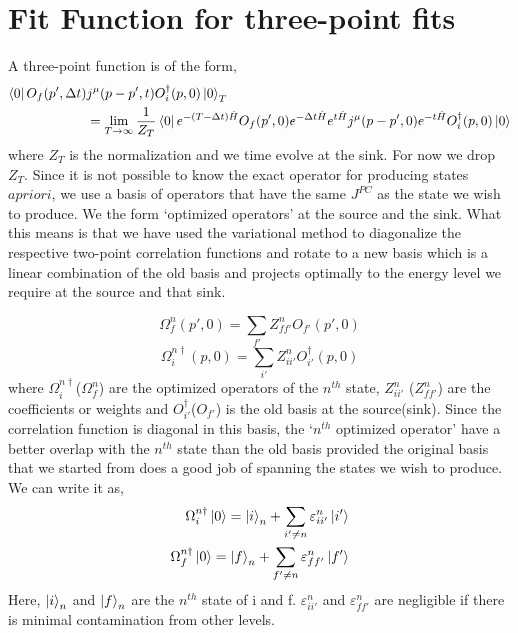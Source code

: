 \documentclass[10pt]{article}
\begin{document}
\section{Fit Function for three-point fits}
A three-point function is of the form,
\begin{align*}
\bra{0}O_{f}(p',\Delta t)&j^{\mu}(p - p',t)O^{\dagger}_{i}(p,0) \ket{0}_T \\
&= \lim_{T \to \infty} \frac{1}{Z_T} \bra{0}e^{-(T- \Delta t)\hat{H}}O_{f}(p',0)e^{- \Delta t \hat{H}} e^{ t \hat{H}} j^{\mu}(p - p',0) e^{ - t \hat{H}} O^{\dagger}_{i}(p,0) \ket{0}
\end{align*}
where $Z_T$ is the normalization and we time evolve at the sink.  For now we drop $Z_T$. Since it is not possible to know the exact operator for producing states $apriori$, we use a basis of operators that have the same $J^{PC}$ as the state we wish to produce. We the form `optimized operators' at the source and the sink. What this means is that we have used the variational method to diagonalize the respective two-point correlation functions and rotate to a new basis which is a linear combination of the old basis and projects optimally to the energy level we require at the source and that sink. \par
\begin{equation}
\Omega^{n}_{f}(p',0) = \sum_{f'} Z^{n}_{ff'} O_{f'}(p',0) 
\end{equation}
\begin{equation}
\Omega^{n\dagger}_{i}(p,0) = \sum_{i'} Z^{n}_{ii'} O^{\dagger}_{i'}(p,0)
\end{equation}
where $\Omega^{n\dagger}_{i}$($\Omega^{n}_{f}$) are the optimized operators of the $n^{th}$ state, $ Z^{n}_{ii'}$ ($Z^{n}_{ff'} $) are the coefficients or weights and $O^{\dagger}_{i'}$($O_{f'}$) is the old basis at the source(sink).  Since the correlation function is diagonal in this basis, the `$n^{th}$ optimized operator' have a better overlap with the $n^{th}$ state than the old basis provided the original basis that we started from does a good job of spanning the states we wish to produce.  We can write it as,
\begin{align*}
\Omega^{n\dagger}_{i}\ket{0} = \ket{i}_n + \sum_{i' \ne n} \varepsilon^{n}_{ii'} \ket{i'}\\
\Omega^{n\dagger}_{f}\ket{0} = \ket{f}_n + \sum_{f' \ne n} \varepsilon^{n}_{ff'} \ket{f'}
\end{align*}
Here, $\ket{i}_n$ and $\ket{f}_n$ are the $n^{th}$ state of i and f. $ \varepsilon^{n}_{ii'}$ and $ \varepsilon^{n}_{ff'}$ are negligible if there is minimal contamination from other levels.
\end{document}
